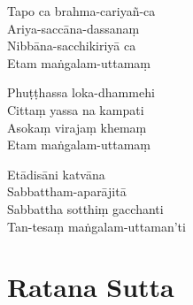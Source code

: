 \begin{paritta}
Tapo ca brahma-cariyañ-ca\\
Ariya-saccāna-dassanaṃ\\
Nibbāna-sacchikiriyā ca\\
Etam maṅgalam-uttamaṃ

Phuṭṭhassa loka-dhammehi\\
Cittaṃ yassa na kampati\\
Asokaṃ virajaṃ khemaṃ\\
Etam maṅgalam-uttamaṃ

Etādisāni katvāna\\
Sabbattham-aparājitā\\
Sabbattha sotthiṃ gacchanti\\
Tan-tesaṃ maṅgalam-uttaman'ti

\end{paritta}

\section{Ratana Sutta}

